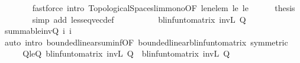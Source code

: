 \begin{isabellebody}
\ \ \ \ \ \ \isamarkupfalse%
\ {\isacharparenleft}{\kern0pt}fastforce\ intro{\isacharcolon}{\kern0pt}\ Topological{\isacharunderscore}{\kern0pt}Spaces{\isachardot}{\kern0pt}lim{\isacharunderscore}{\kern0pt}mono{\isacharbrackleft}{\kern0pt}OF\ le{\isacharunderscore}{\kern0pt}n{\isacharunderscore}{\kern0pt}elem\ le{}\ le{}{\isacharbrackright}{\kern0pt}{\isacharparenright}{\kern0pt}\isanewline
\ \ \ \ \isamarkupfalse%
\ {\isacharquery}{\kern0pt}thesis\isanewline
\ \ \ \ \ \ \isamarkupfalse%
\ {\isacharparenleft}{\kern0pt}simp\ add{\isacharcolon}{\kern0pt}\ less{\isacharunderscore}{\kern0pt}eq{\isacharunderscore}{\kern0pt}vec{\isacharunderscore}{\kern0pt}def{\isacharparenright}{\kern0pt}\isanewline
\ \ \isamarkupfalse%
\isanewline
\ \ \isamarkupfalse%
\ \isamarkupfalse%
\ {\isachardoublequoteopen}{\isasymdots}\ {\isacharequal}{\kern0pt}\ blinfun{\isacharunderscore}{\kern0pt}to{\isacharunderscore}{\kern0pt}matrix\ {\isacharparenleft}{\kern0pt}inv\isactrlsub L\ Q{}{\isacharparenright}{\kern0pt}{\isachardoublequoteclose}\isanewline
\ \ \ \ \isamarkupfalse%
\ summable{\isacharunderscore}{\kern0pt}inv{\isacharunderscore}{\kern0pt}Q\ i{}{\isacharparenleft}{\kern0pt}{}{\isacharparenright}{\kern0pt}\ i{}\isanewline
\ \ \ \ \isamarkupfalse%
\ {\isacharparenleft}{\kern0pt}auto\ intro{\isacharbang}{\kern0pt}{\isacharcolon}{\kern0pt}\ bounded{\isacharunderscore}{\kern0pt}linear{\isachardot}{\kern0pt}suminf{\isacharbrackleft}{\kern0pt}OF\ bounded{\isacharunderscore}{\kern0pt}linear{\isacharunderscore}{\kern0pt}blinfun{\isacharunderscore}{\kern0pt}to{\isacharunderscore}{\kern0pt}matrix{\isacharcomma}{\kern0pt}\ symmetric{\isacharbrackright}{\kern0pt}{\isacharparenright}{\kern0pt}\isanewline
\ \ \isamarkupfalse%
\ \isamarkupfalse%
\ Q{}{\isacharunderscore}{\kern0pt}le{\isacharunderscore}{\kern0pt}Q{}{\isacharcolon}{\kern0pt}\ {\isachardoublequoteopen}blinfun{\isacharunderscore}{\kern0pt}to{\isacharunderscore}{\kern0pt}matrix\ {\isacharparenleft}{\kern0pt}inv\isactrlsub L\ Q{}{\isacharparenright}{\kern0pt}\ {\isasymle}\ blinfun{\isacharunderscore}{\kern0pt}to{\isacharunderscore}{\kern0pt}matrix\ {\isacharparenleft}{\kern0pt}inv\isactrlsub L\ Q{}{\isacharparenright}{\kern0pt}{\isachardoublequoteclose}\ \isacommand{{\isachardot}{\kern0pt}}\isamarkupfalse%
\isanewline
\isanewline
\ \ \isamarkupfalse%

\end{isabellebody}
